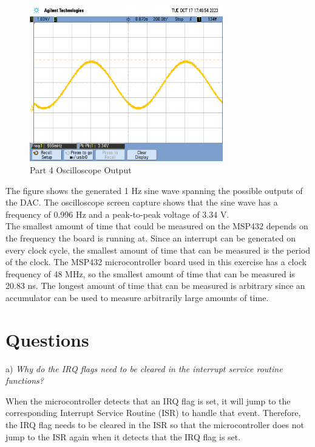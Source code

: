 \documentclass[CMPE]{KGCOEReport}
\begin{document}
\begin{figure}[H]
    \centering
    \includegraphics[width=0.75\textwidth]{part4.png}
    \caption{Part 4 Oscilloscope Output}
    \label{fig:part4}
\end{figure}

The figure shows the generated 1 Hz sine wave spanning the possible outputs of the DAC. The oscilloscope screen capture shows that the sine wave has a frequency of 0.996 Hz and a peak-to-peak voltage of 3.34 V.\\

The smallest amount of time that could be measured on the MSP432 depends on the frequency the board is running at. Since an interrupt can be generated on every clock cycle, the smallest amount of time that can be measured is the period of the clock. The MSP432 microcontroller board used in this exercise has a clock frequency of 48 MHz, so the smallest amount of time that can be measured is 20.83 ns. The longest amount of time that can be measured is arbitrary since an accumulator can be used to measure arbitrarily large amounts of time.\\


\section*{Questions}

a) \emph{Why do the IRQ flags need to be cleared in the interrupt service routine functions?}

When the microcontroller detects that an IRQ flag is set, it will jump to the corresponding Interrupt Service Routine (ISR) to handle that event. Therefore, the IRQ flag needs to be cleared in the ISR so that the microcontroller does not jump to the ISR again when it detects that the IRQ flag is set.\\
\bigskip
\end{document}
